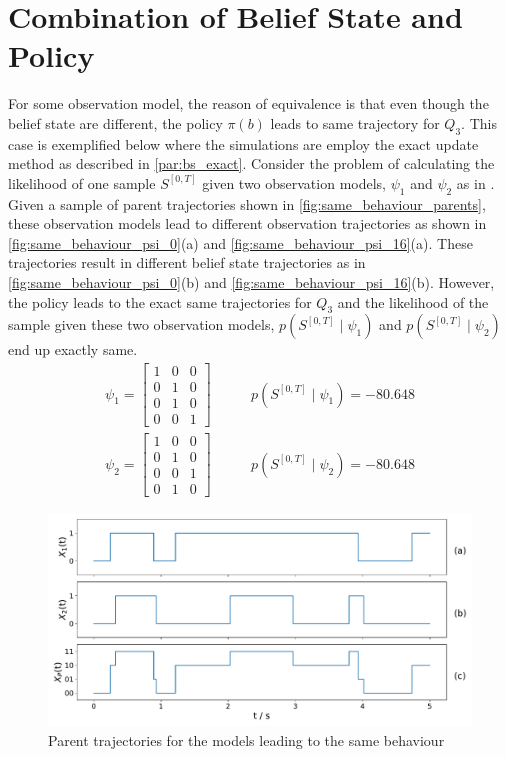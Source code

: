 \section*{Combination of Belief State and Policy}
\label{ap:eq_classes_same_behaviour}
For some observation model, the reason of equivalence is that even though the belief state are different, the policy $ \pi(b) $ leads to same trajectory for $ Q_3 $. This case is exemplified below where the simulations are employ the exact update method as described in \cref{par:bs_exact}. Consider the problem of calculating the likelihood of one sample $ S^{[0,T]} $ given two observation models, $ \psi_1 $ and $ \psi_2 $ as in . Given a sample of parent trajectories shown in \autoref{fig:same_behaviour_parents}, these observation models lead to different observation trajectories as shown in \autoref{fig:same_behaviour_psi_0}(a) and \autoref{fig:same_behaviour_psi_16}(a). These trajectories result in different belief state trajectories as in \autoref{fig:same_behaviour_psi_0}(b) and \autoref{fig:same_behaviour_psi_16}(b). However, the policy leads to the exact same trajectories for $ Q_3 $ and the likelihood of the sample given these two observation models, $ p(S^{[0,T]} \mid \psi_1 ) $ and $ p(S^{[0,T]} \mid \psi_2 ) $ end up exactly same.
\begin{align}
\psi_{1} =
\begin{bmatrix}
1 & 0 & 0 \\
0 & 1 & 0 \\
0 & 1 & 0 \\
0 & 0 & 1
\end{bmatrix} &\quad \quad
p(S^{[0,T]} \mid \psi_1 ) = -80.648 \label{eq:psi_1_1}\\
\psi_{2} =
\begin{bmatrix}
1 & 0 & 0 \\
0 & 1 & 0 \\
0 & 0 & 1 \\
0 & 1 & 0 
\end{bmatrix} &\quad \quad
p(S^{[0,T]} \mid \psi_2 ) = -80.648
\label{eq:psi_16}
\end{align}
\begin{figure}[H]
	\begin{center}
		\includegraphics[width=.90\textwidth]{figures/equivalence_classes/same_behaviour/parent_traj}
		\caption[Parent trajectories for the models leading to the same belief state]{Parent trajectories for the models leading to the same behaviour}
		\label{fig:same_behaviour_parents}
	\end{center}
\end{figure}
